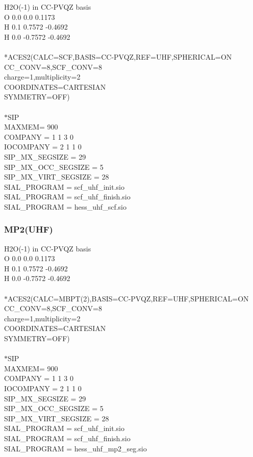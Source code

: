\documentclass[12pt]{article}
\begin{document}
H2O(-1) in CC-PVQZ basis\\ 
O  0.0  0.0      0.1173\\
H  0.1  0.7572  -0.4692\\
H  0.0 -0.7572  -0.4692\\
\\
*ACES2(CALC=SCF,BASIS=CC-PVQZ,REF=UHF,SPHERICAL=ON\\
CC\_CONV=8,SCF\_CONV=8\\
charge=1,multiplicity=2\\
COORDINATES=CARTESIAN\\
SYMMETRY=OFF)\\ 
\\
$*$SIP\\
MAXMEM= 900\\
COMPANY   = 1 1 3 0\\
IOCOMPANY = 2 1 1 0\\
SIP\_MX\_SEGSIZE      = 29\\ 
SIP\_MX\_OCC\_SEGSIZE  = 5\\
SIP\_MX\_VIRT\_SEGSIZE = 28\\
SIAL\_PROGRAM = scf\_uhf\_init.sio\\ 
SIAL\_PROGRAM = scf\_uhf\_finish.sio\\
SIAL\_PROGRAM = hess\_uhf\_scf.sio\\


\newpage 



\noindent 
\subsubsection{MP2(UHF)}
H2O(-1) in CC-PVQZ basis\\ 
O  0.0  0.0      0.1173\\ 
H  0.1  0.7572  -0.4692\\ 
H  0.0 -0.7572  -0.4692\\ 
\\
$*$ACES2(CALC=MBPT(2),BASIS=CC-PVQZ,REF=UHF,SPHERICAL=ON\\ 
CC\_CONV=8,SCF\_CONV=8\\ 
charge=1,multiplicity=2\\ 
COORDINATES=CARTESIAN\\ 
SYMMETRY=OFF)\\ 
\\
$*$SIP\\ 
MAXMEM= 900\\ 
COMPANY   = 1 1 3 0\\
IOCOMPANY = 2 1 1 0\\
SIP\_MX\_SEGSIZE      = 29\\
SIP\_MX\_OCC\_SEGSIZE  = 5\\
SIP\_MX\_VIRT\_SEGSIZE = 28\\
SIAL\_PROGRAM = scf\_uhf\_init.sio\\
SIAL\_PROGRAM = scf\_uhf\_finish.sio\\
SIAL\_PROGRAM = hess\_uhf\_mp2\_seg.sio\\
\end{document}
